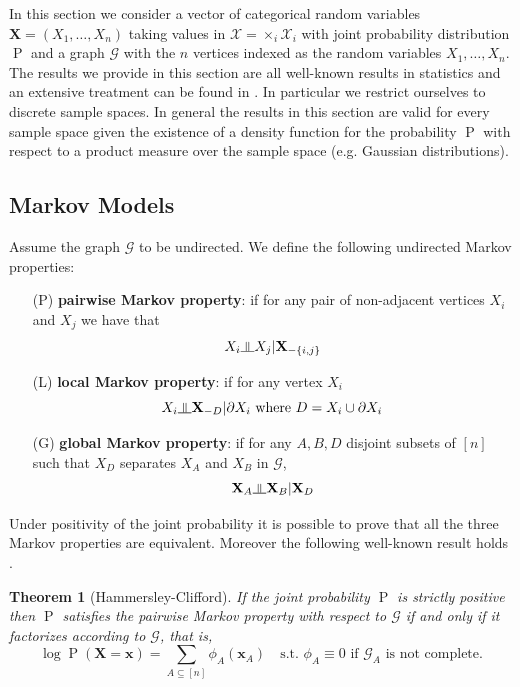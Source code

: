 \documentclass[11pt,a4paper, twoside]{book}
\newtheorem{theorem}{Theorem}[chapter]
\newcommand{\indep}{\rotatebox[origin=c]{90}{$\models$}}
\newcommand{\Pp}{\operatorname{P}}
\newcommand{\bx}{\mathbf{x}}
\newcommand{\bX}{\mathbf{X}}
\newcommand{\bchi}{\boldsymbol{\mathcal{X}}}
\newcommand{\nchi}{\mathcal{X}}
\begin{document}
In this section we consider a vector of categorical random variables $\bX = (X_1,\ldots,X_n)$ taking values in $\bchi=\times_{i}\nchi_i$ with joint probability distribution $\Pp$ and a graph $\mathcal{G}$ with the $n$ vertices indexed as the random variables $X_1,\ldots,X_n$. 
The results we provide in this section are all well-known results in statistics and an extensive treatment can be found in \cite{lauritzen1996}. In particular we restrict ourselves to discrete sample spaces. In general the results in this section are valid for every sample space given the existence of a density function for the probability $\Pp$ with respect to a product measure over the sample space (e.g. Gaussian distributions).

\subsection{Markov Models}
Assume the graph $\mathcal{G}$ to be undirected. We define the following undirected  Markov properties:
\begin{itemize}
\item[(P)] \textbf{pairwise Markov property}: if for any pair of non-adjacent vertices $X_i$ and $X_j$ we have that
$$ X_i \indep X_j | \bX_{-\{i,j\}} $$ 
\item[(L)] \textbf{local Markov property}: if for any vertex $X_i$
$$ X_i \indep \bX_{-D} | \partial X_{i} \text{ where } D = {X_i} \cup \partial X_i  $$
\item[(G)] \textbf{global Markov property}: if for any $A,B,D$ disjoint subsets of $[n]$ such that $X_D$ separates $X_A$ and $X_B$ in $\mathcal{G}$, 
$$ \bX_{A} \indep \bX_{B} | \bX_{D} $$
\end{itemize}

Under positivity of the joint probability it is possible to prove that all the three Markov properties are equivalent. Moreover the following well-known result holds \citep{hammersley1971, lauritzen1996, gandolfi2017}.

\begin{theorem}[Hammersley-Clifford]
\label{theo:H-C}
If the joint probability $\Pp$ is strictly positive then $\Pp$ satisfies the pairwise Markov property with respect to $\mathcal{G}$ if and only if it factorizes according to $\mathcal{G}$, that is,
$$ \log\Pp(\bX=\bx) = \sum_{A\subseteq [n]} \phi_A(\bx_A) \quad \text{s.t. } \phi_A\equiv 0 \text{ if } \mathcal{G}_A \text{ is not complete}. $$
\end{theorem}
\end{document}
